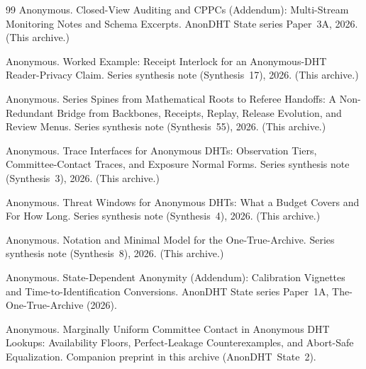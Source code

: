 \documentclass[11pt]{article}
\begin{document}
\begin{thebibliography}{99}
Anonymous.
\newblock Closed-View Auditing and CPPCs (Addendum): Multi-Stream Monitoring Notes and Schema Excerpts.
\newblock AnonDHT State series Paper~3A, 2026. (This archive.)

Anonymous.
\newblock Worked Example: Receipt Interlock for an Anonymous-DHT Reader-Privacy Claim.
\newblock Series synthesis note (Synthesis~17), 2026. (This archive.)

Anonymous.
\newblock Series Spines from Mathematical Roots to Referee Handoffs: A Non-Redundant Bridge from Backbones, Receipts, Replay, Release Evolution, and Review Menus.
\newblock Series synthesis note (Synthesis~55), 2026. (This archive.)

Anonymous.
\newblock Trace Interfaces for Anonymous {DHT}s: Observation Tiers, Committee-Contact Traces, and Exposure Normal Forms.
\newblock Series synthesis note (Synthesis~3), 2026. (This archive.)

Anonymous.
\newblock Threat Windows for Anonymous {DHT}s: What a Budget Covers and For How Long.
\newblock Series synthesis note (Synthesis~4), 2026. (This archive.)


Anonymous.
\newblock Notation and Minimal Model for the One-True-Archive.
\newblock Series synthesis note (Synthesis~8), 2026. (This archive.)



Anonymous.
\newblock State-Dependent Anonymity (Addendum): Calibration Vignettes and Time-to-Identification Conversions.
\newblock AnonDHT State series Paper~1A, The-One-True-Archive (2026).

Anonymous.
\newblock Marginally Uniform Committee Contact in Anonymous DHT Lookups: Availability Floors, Perfect-Leakage Counterexamples, and Abort-Safe Equalization.
\newblock Companion preprint in this archive (AnonDHT~State~2).

\end{thebibliography}
\end{document}
